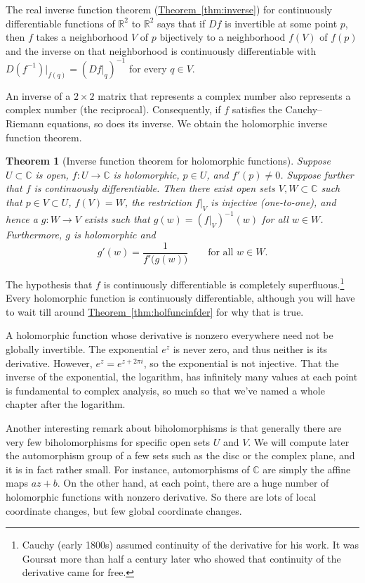 \documentclass[12pt,openany]{book}
\newcommand{\C}{{\mathbb{C}}}
\newcommand{\R}{{\mathbb{R}}}
\theoremstyle{plain}
\newtheorem{thm}{Theorem}[section]
\theoremstyle{remark}
\theoremstyle{definition}
\theoremstyle{exercise}
\theoremstyle{example}
\newcommand{\thmref}[1]{\hyperref[#1]{Theorem~\ref*{#1}}}
\begin{document}
The real inverse function theorem (\thmref{thm:inverse})
for continuously differentiable
functions of $\R^2$ to $\R^2$
says that if $Df$ is invertible at some point $p$, then $f$ takes a
neighborhood $V$ of $p$ bijectively to a neighborhood $f(V)$
of $f(p)$ and the inverse on that neighborhood is continuously
differentiable with $D(f^{-1})|_{f(q)} = (Df|_q)^{-1}$ for every $q \in V$.

An inverse of a $2 \times 2$ matrix that represents a complex number also
represents a complex number (the reciprocal).  Consequently, if $f$
satisfies the Cauchy--Riemann equations, so does its inverse.
We obtain the holomorphic inverse function theorem.

\begin{thm}[Inverse function theorem for holomorphic functions]
\label{thm:inversehol}
Suppose $U \subset \C$ is open, $f \colon U \to \C$ is holomorphic,
$p \in U$, and $f'(p) \neq 0$.  Suppose further that $f$ is continuously
differentiable.
Then there exist open sets $V, W \subset \C$ such that
$p \in V \subset U$, $f(V) = W$, the restriction $f|_V$ is injective
(one-to-one),
and hence a $g \colon W \to V$ exists such that
$g(w) = (f|_V)^{-1}(w)$ for all $w \in W$.
Furthermore, $g$ is holomorphic and
\begin{equation*}
g'(w) = \frac{1}{f'\bigl(g(w)\bigr)} \qquad \text{for all $w \in W$}.
\end{equation*}
\end{thm}

The hypothesis that $f$ is continuously differentiable is completely
superfluous.\footnote{Cauchy (early 1800s)
assumed continuity of the derivative for his work.
It was Goursat more than half a century later who showed that continuity of the
derivative came for free.}
Every holomorphic function is continuously
differentiable, although you will have to wait till around
\thmref{thm:holfuncinfder} for why that is true.

A holomorphic function whose derivative is nonzero
everywhere need not be globally invertible.  The exponential $e^z$
is never zero, and thus neither is its derivative.  However, $e^{z} = e^{z+2\pi i}$,
so the
exponential is not injective.
That the inverse of the
exponential, the logarithm,
has infinitely many values at each point is fundamental to complex analysis,
so much so that we've named a whole chapter after the logarithm.

Another interesting remark about biholomorphisms is that generally
there are very few biholomorphisms for specific open sets $U$ and $V$.  We will
compute later the automorphism group of a few sets such as the disc or the
complex plane, and it is in fact rather small.
For instance, automorphisms of $\C$ are simply the affine maps $a
z + b$.  On the other hand, at each point, there are a huge number of
holomorphic functions with nonzero derivative.  So there are lots of local
coordinate changes, but few global coordinate changes.
\end{document}
